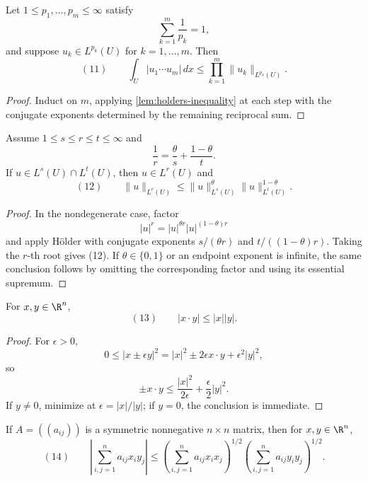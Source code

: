 \begin{lemma}
\label{lem:general-holder-inequality}

Let $1\leq p_1,\ldots,p_m\leq\infty$ satisfy
\[
\sum_{k=1}^m\frac1{p_k}=1,
\]
and suppose $u_k\in L^{p_k}(U)$ for $k=1,\ldots,m$. Then
\[
(11)\qquad
\int_U|u_1\cdots u_m|\,dx
\leq\prod_{k=1}^m\|u_k\|_{L^{p_k}(U)}.
\]
\end{lemma}
\begin{proof}
\sketch Induct on $m$, applying \cref{lem:holders-inequality} at each step with the conjugate exponents determined by the remaining reciprocal sum.
\end{proof}

\begin{lemma}
\label{lem:interpolation-inequality-lp-norms}

Assume $1\leq s\leq r\leq t\leq\infty$ and
\[
\frac1r=\frac\theta s+\frac{1-\theta}{t}.
\]
If $u\in L^s(U)\cap L^t(U)$, then $u\in L^r(U)$ and
\[
(12)\qquad
\|u\|_{L^r(U)}
\leq\|u\|_{L^s(U)}^\theta
\|u\|_{L^t(U)}^{1-\theta}.
\]
\end{lemma}
\begin{proof}
\sketch In the nondegenerate case, factor
\[
|u|^r=|u|^{\theta r}|u|^{(1-\theta)r}
\]
and apply H\"older with conjugate exponents $s/(\theta r)$ and $t/((1-\theta)r)$. Taking the $r$-th root gives (12). If $\theta\in\{0,1\}$ or an endpoint exponent is infinite, the same conclusion follows by omitting the corresponding factor and using its essential supremum.
\end{proof}

\begin{lemma}
\label{lem:cauchy-schwarz-inequality}
For $x,y\in\R^n$,
\[
(13)\qquad |x\cdot y|\leq|x||y|.
\]
\end{lemma}
\begin{proof}
\sketch For $\epsilon>0$,
\[
0\leq|x\pm\epsilon y|^2
=|x|^2\pm2\epsilon x\cdot y+\epsilon^2|y|^2,
\]
so
\[
\pm x\cdot y
\leq\frac{|x|^2}{2\epsilon}+\frac\epsilon2|y|^2.
\]
If $y\ne0$, minimize at $\epsilon=|x|/|y|$; if $y=0$, the conclusion is immediate.
\end{proof}

\begin{remark}
\label{rem:cauchy-schwarz-matrix-form}

If $A=((a_{ij}))$ is a symmetric nonnegative $n\times n$ matrix, then for $x,y\in\R^n$,
\[
(14)\qquad
\left|\sum_{i,j=1}^na_{ij}x_iy_j\right|
\leq
\left(\sum_{i,j=1}^na_{ij}x_ix_j\right)^{1/2}
\left(\sum_{i,j=1}^na_{ij}y_iy_j\right)^{1/2}.
\]
\end{remark}

